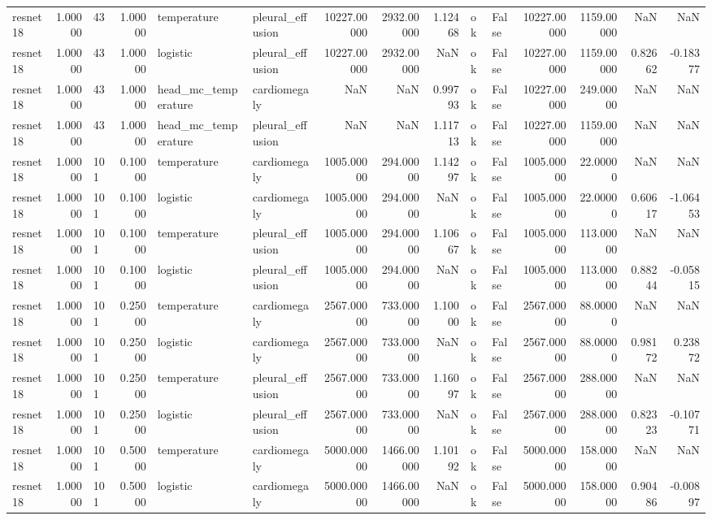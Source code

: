 \begin{tabular}{lrlrllrrrllrrrr}
resnet18 & 1.00000 & 43 & 1.00000 & temperature & pleural\_effusion & 10227.00000 & 2932.00000 & 1.12468 & ok & False & 10227.00000 & 1159.00000 & NaN & NaN \\
resnet18 & 1.00000 & 43 & 1.00000 & logistic & pleural\_effusion & 10227.00000 & 2932.00000 & NaN & ok & False & 10227.00000 & 1159.00000 & 0.82662 & -0.18377 \\
resnet18 & 1.00000 & 43 & 1.00000 & head\_mc\_temperature & cardiomegaly & NaN & NaN & 0.99793 & ok & False & 10227.00000 & 249.00000 & NaN & NaN \\
resnet18 & 1.00000 & 43 & 1.00000 & head\_mc\_temperature & pleural\_effusion & NaN & NaN & 1.11713 & ok & False & 10227.00000 & 1159.00000 & NaN & NaN \\
resnet18 & 1.00000 & 101 & 0.10000 & temperature & cardiomegaly & 1005.00000 & 294.00000 & 1.14297 & ok & False & 1005.00000 & 22.00000 & NaN & NaN \\
resnet18 & 1.00000 & 101 & 0.10000 & logistic & cardiomegaly & 1005.00000 & 294.00000 & NaN & ok & False & 1005.00000 & 22.00000 & 0.60617 & -1.06453 \\
resnet18 & 1.00000 & 101 & 0.10000 & temperature & pleural\_effusion & 1005.00000 & 294.00000 & 1.10667 & ok & False & 1005.00000 & 113.00000 & NaN & NaN \\
resnet18 & 1.00000 & 101 & 0.10000 & logistic & pleural\_effusion & 1005.00000 & 294.00000 & NaN & ok & False & 1005.00000 & 113.00000 & 0.88244 & -0.05815 \\
resnet18 & 1.00000 & 101 & 0.25000 & temperature & cardiomegaly & 2567.00000 & 733.00000 & 1.10000 & ok & False & 2567.00000 & 88.00000 & NaN & NaN \\
resnet18 & 1.00000 & 101 & 0.25000 & logistic & cardiomegaly & 2567.00000 & 733.00000 & NaN & ok & False & 2567.00000 & 88.00000 & 0.98172 & 0.23872 \\
resnet18 & 1.00000 & 101 & 0.25000 & temperature & pleural\_effusion & 2567.00000 & 733.00000 & 1.16097 & ok & False & 2567.00000 & 288.00000 & NaN & NaN \\
resnet18 & 1.00000 & 101 & 0.25000 & logistic & pleural\_effusion & 2567.00000 & 733.00000 & NaN & ok & False & 2567.00000 & 288.00000 & 0.82323 & -0.10771 \\
resnet18 & 1.00000 & 101 & 0.50000 & temperature & cardiomegaly & 5000.00000 & 1466.00000 & 1.10192 & ok & False & 5000.00000 & 158.00000 & NaN & NaN \\
resnet18 & 1.00000 & 101 & 0.50000 & logistic & cardiomegaly & 5000.00000 & 1466.00000 & NaN & ok & False & 5000.00000 & 158.00000 & 0.90486 & -0.00897 \\

\end{tabular}
